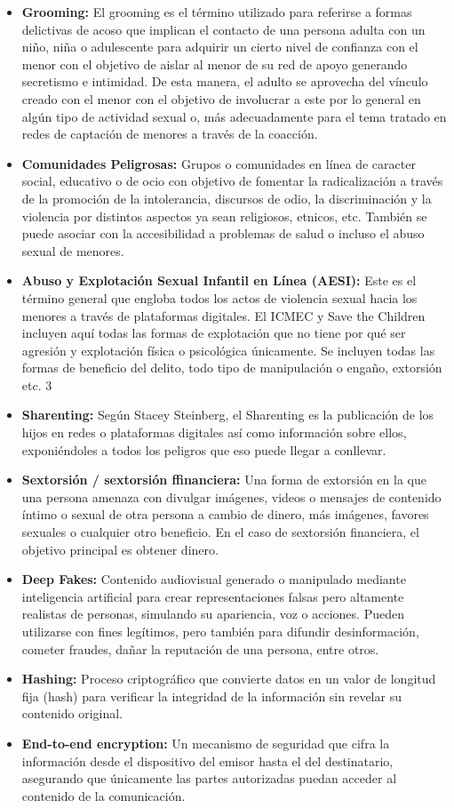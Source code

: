 \begin{itemize}
  \item \textbf{Grooming:} El grooming es el término utilizado para referirse a formas delictivas de acoso que implican el contacto de una persona adulta con un niño, niña o adulescente para adquirir un cierto nivel de confianza con el menor con el objetivo de aislar al menor de su red de apoyo generando secretismo e intimidad. De esta manera, el adulto se aprovecha del vínculo creado con el menor con el objetivo de involucrar a este por lo general en algún tipo de actividad sexual o, más adecuadamente para el tema tratado en redes de captación de menores a través de la coacción.
  \item \textbf{Comunidades Peligrosas:} Grupos o comunidades en línea de caracter social, educativo o de ocio con objetivo de fomentar la radicalización a través de la promoción de la intolerancia, discursos de odio, la discriminación y la violencia por distintos aspectos ya sean religiosos, etnicos, etc. También se puede asociar con la accesibilidad a problemas de salud o incluso el abuso sexual de menores.
  \item \textbf{Abuso y Explotación Sexual Infantil en Línea (AESI):} Este es el término general que engloba todos los actos de violencia sexual hacia los menores a través de plataformas digitales. El ICMEC y Save the Children incluyen aquí todas las formas de explotación que no tiene por qué ser agresión y explotación física o psicológica únicamente. Se incluyen todas las formas de beneficio del delito, todo tipo de manipulación o engaño, extorsión etc. 3
  \item \textbf{Sharenting:} Según Stacey Steinberg, el Sharenting es la publicación de los hijos en redes o plataformas digitales así como información sobre ellos, exponiéndoles a todos los peligros que eso puede llegar a conllevar.
  \item \textbf{Sextorsión / sextorsión ffinanciera:} Una forma de extorsión en la que una persona amenaza con divulgar imágenes, videos o mensajes de contenido íntimo o sexual de otra persona a cambio de dinero, más imágenes, favores sexuales o cualquier otro beneficio. En el caso de sextorsión financiera, el objetivo principal es obtener dinero.
  \item \textbf{Deep Fakes:} Contenido audiovisual generado o manipulado mediante inteligencia artificial para crear representaciones falsas pero altamente realistas de personas, simulando su apariencia, voz o acciones. Pueden utilizarse con fines legítimos, pero también para difundir desinformación, cometer fraudes, dañar la reputación de una persona, entre otros.
  \item \textbf{Hashing:} Proceso criptográfico que convierte datos en un valor de longitud fija (hash) para verificar la integridad de la información sin revelar su contenido original.
  \item \textbf{End-to-end encryption:} Un mecanismo de seguridad que cifra la información desde el dispositivo del emisor hasta el del destinatario, asegurando que únicamente las partes autorizadas puedan acceder al contenido de la comunicación.
\end{itemize}

